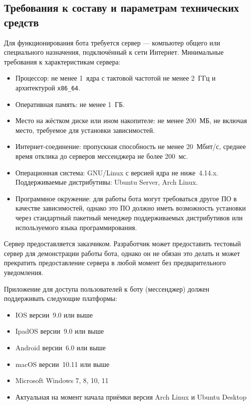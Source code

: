 \subsection{Требования к составу и параметрам технических средств}
\label{sec:req:hw}
Для функционирования бота требуется сервер --- компьютер общего или специального назначения,
подключённый к сети Интернет. Минимальные требования к характеристикам сервера:
\begin{itemize}
    \item
        Процессор: не менее 1~ядра с тактовой частотой не менее 2~ГГц и архитектурой
        \texttt{x86\_64}.
    \item
        Оперативная память: не менее 1~ГБ.
    \item
        Место на жёстком диске или ином накопителе: не менее 200~МБ, не включая место, требуемое
        для установки зависимостей.
    \item
        Интернет-соединение: пропускная способность не менее 20~Мбит/с, среднее время отклика
        до серверов мессенджера не более 200~мс.
    \item
        Операционная система: GNU/Linux с версией ядра не ниже~4.14.x.
        Поддерживаемые дистрибутивы: Ubuntu Server, Arch Linux.
    \item
        Программное окружение: для работы бота могут требоваться другое ПО в качестве зависимостей,
        однако это ПО должно иметь возможность установки через стандартный пакетный менеджер
        поддерживаемых дистрибутивов или используемого языка программирования.
\end{itemize}
Сервер предоставляется заказчиком. Разработчик может предоставить тестовый сервер для демонстрации
работы бота, однако он не обязан это делать и может прекратить предоставление сервера в любой момент
без предварительного уведомления.

Приложение для доступа пользователей к боту (мессенджер) должен поддерживать следующие платформы:
\begin{itemize}
    \item
        IOS версии~9.0 или выше
    \item
        IpadOS версии~9.0 или выше
    \item
        Android версии~6.0 или выше
    \item
        macOS версии~10.11 или выше
    \item
        Microsoft Windows 7, 8, 10, 11
    \item
        Актуальная на момент начала приёмки версия Arch Linux и Ubuntu Desktop
\end{itemize}
